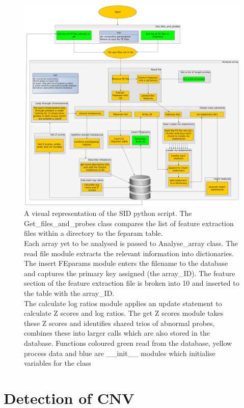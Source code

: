 \begin{figure}
\centering
\includegraphics[width=1.2\linewidth]{./Figures/program_overview_extensive2}
\caption[A visual representation of the SID python script]{A visual representation of the SID python script. The Get\_files\_and\_probes class compares the list of feature extraction files within a directory to the feparam table.\\ Each array yet to be analysed is passed to Analyse\_array class. The read file module extracts the relevant information into dictionaries. The insert FEparams module enters the filename to the database and captures the primary key assigned (the array\_ID). The feature section of the feature extraction file is broken into 10 and inserted to the table with the array\_ID.\\ The calculate log ratios module applies an update statement to calculate Z scores and log ratios. The get Z scores module takes these Z scores and identifies shared trios of abnormal probes, combines these into larger calls which are also stored in the database. Functions coloured green read from the database, yellow process data and blue are \_\_init\_\_ modules which initialise variables for the class}
\label{fig:program_overview_extensive2}
\end{figure}

\section{Detection of CNV}
